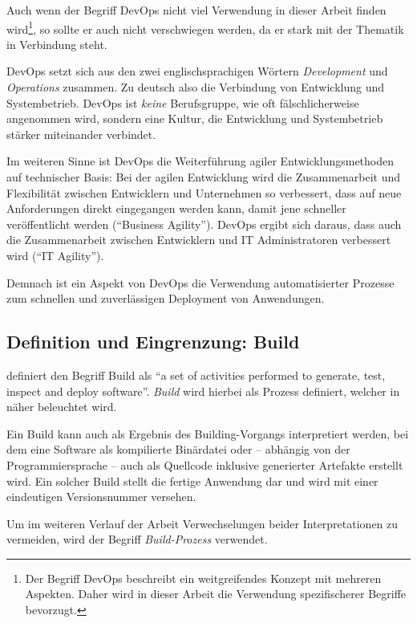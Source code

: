 Auch wenn der Begriff DevOps nicht viel Verwendung in dieser Arbeit finden wird\footnote{Der Begriff DevOps beschreibt ein weitgreifendes Konzept mit mehreren Aspekten. Daher wird in dieser Arbeit die Verwendung spezifischerer Begriffe bevorzugt.}, so sollte er auch nicht verschwiegen werden, da er stark mit der Thematik in Verbindung steht.

DevOps setzt sich aus den zwei englischsprachigen Wörtern \emph{Development} und \emph{Operations} zusammen. Zu deutsch also die Verbindung von Entwicklung und Systembetrieb. DevOps ist \emph{keine} Berufsgruppe, wie oft fälschlicherweise angenommen wird, sondern eine Kultur, die Entwicklung und Systembetrieb stärker miteinander verbindet.

Im weiteren Sinne ist DevOps die Weiterführung agiler Entwicklungsmethoden auf technischer Basis: Bei der agilen Entwicklung wird die Zusammenarbeit und Flexibilität zwischen Entwicklern und Unternehmen so verbessert, dass auf neue Anforderungen direkt eingegangen werden kann, damit jene schneller veröffentlicht werden (``Business Agility''). DevOps ergibt sich daraus, dass auch die Zusammenarbeit zwischen Entwicklern und IT Administratoren verbessert wird (``IT Agility''). \citep[4f]{Chapman2014}

Demnach ist ein Aspekt von DevOps die Verwendung automatisierter Prozesse zum schnellen und zuverlässigen Deployment von Anwendungen.

\subsection{Definition und Eingrenzung: Build}
\label{subsec:build}

\citet[27]{Duvall2007} definiert den Begriff Build als ``a set of activities performed to generate, test, inspect and deploy software''. \emph{Build} wird hierbei als Prozess definiert, welcher in  näher beleuchtet wird.

Ein Build kann auch als Ergebnis des Building-Vorgangs interpretiert werden, bei dem eine Software als kompilierte Binärdatei oder – abhängig von der Programmiersprache – auch als Quellcode inklusive generierter Artefakte erstellt wird. Ein solcher Build stellt die fertige Anwendung dar und wird mit einer eindeutigen Versionsnummer versehen.

Um im weiteren Verlauf der Arbeit Verwechselungen beider Interpretationen zu vermeiden, wird der Begriff \emph{Build-Prozess} verwendet.

